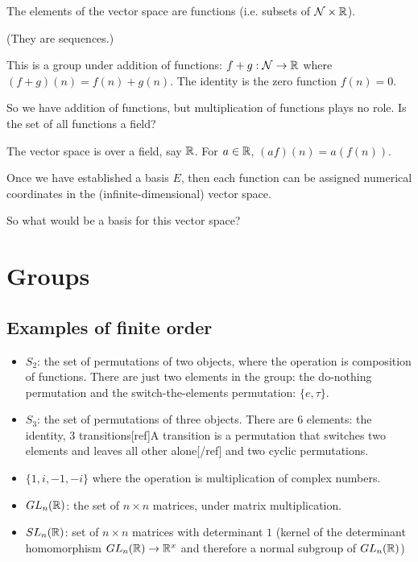 The elements of the vector space are functions (i.e. subsets of $\mathcal{N} \times \mathbb{R}$).

(They are sequences.)

This is a group under addition of functions: $f + g: \mathcal{N} \to \mathbb{R}$ where
$(f + g)(n) = f(n) + g(n)$. The identity is the zero function $f(n) = 0$.

So we have addition of functions, but multiplication of functions plays no
role. Is the set of all functions a field?


The vector space is over a field, say $\mathbb{R}$. For $a \in \mathbb{R}$, $(af)(n) = a(f(n))$.

Once we have established a basis $E$, then each function can be assigned
numerical coordinates in the (infinite-dimensional) vector space.

So what would be a basis for this vector space?




\newpage
\section{Groups}


\subsection{Examples of finite order}

\begin{itemize}
\item $S_2$: the set of permutations of two objects, where the operation is
  composition of functions.  There are just two elements in the group: the
  do-nothing permutation and the switch-the-elements permutation: $\{e,
  \tau\}$.

\item $S_3$: the set of permutations of three objects. There are 6 elements: the
  identity, 3 transitions[ref]A transition is a permutation that switches two
  elements and leaves all other alone[/ref] and two cyclic permutations.

\item $\{1, i, -1, -i\}$ where the operation is multiplication of complex numbers.

\item $GL_n(\mathbb{R})$: the set of $n \times n$ matrices, under matrix multiplication.

\item $SL_n(\mathbb{R})$: set of $n \times n$ matrices with determinant $1$ (kernel of the
  determinant homomorphism $GL_n(\mathbb{R}) \rightarrow \mathbb{R}^x$ and therefore a normal
  subgroup of $GL_n(\mathbb{R})$)
\end{itemize}

